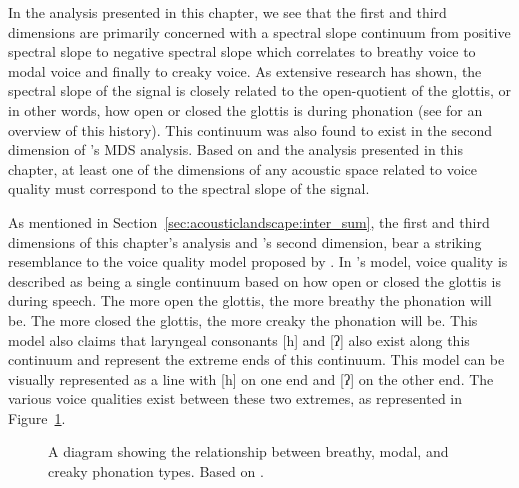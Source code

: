 In the analysis presented in this chapter, we see that the first and third dimensions are primarily concerned with a spectral slope continuum from positive spectral slope to negative spectral slope which correlates to breathy voice to modal voice and finally to creaky voice. As extensive research has shown, the spectral slope of the signal is closely related to the open-quotient of the glottis, or in other words, how open or closed the glottis is during phonation (see \citet{garellekTheoreticalAchievementsPhonetics2022} for an overview of this history). This continuum was also found to exist in the second dimension of \citeauthor{keatingCrosslanguageAcousticSpace2023}'s \citeyear{keatingCrosslanguageAcousticSpace2023} MDS analysis. Based on \citet{keatingCrosslanguageAcousticSpace2023} and the analysis presented in this chapter, at least one of the dimensions of any acoustic space related to voice quality must correspond to the spectral slope of the signal. 

As mentioned in Section~\ref{sec:acousticlandscape:inter_sum}, the first and third dimensions of this chapter's analysis and \citeauthor{keatingCrosslanguageAcousticSpace2023}'s second dimension, bear a striking resemblance to the voice quality model proposed by \citet{gordonPhonationTypesCrosslinguistic2001}. In \citeauthor{gordonPhonationTypesCrosslinguistic2001}'s model, voice quality is described as being a single continuum based on how open or closed the glottis is during speech. The more open the glottis, the more breathy the phonation will be. The more closed the glottis, the more creaky the phonation will be. This model also claims that laryngeal consonants [h] and [ʔ] also exist along this continuum and represent the extreme ends of this continuum.  This model can be visually represented as a line with [h] on one end and [ʔ] on the other end. The various voice qualities exist between these two extremes, as represented in Figure~\ref{fig:phonation_types_1}.

\begin{figure}[h!]
    \centering
    \caption{A diagram showing the relationship between breathy, modal, and creaky phonation types. Based on \citet{gordonPhonationTypesCrosslinguistic2001}.}
    \label{fig:phonation_types_1}
\end{figure}

